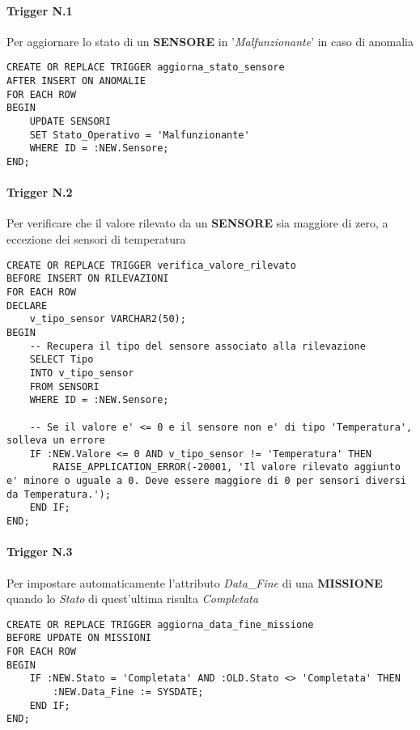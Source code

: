 \paragraph{Trigger N.1} Per aggiornare lo stato di un \textbf{SENSORE} in '\textit{Malfunzionante}' in caso di anomalia
\begin{lstlisting}
CREATE OR REPLACE TRIGGER aggiorna_stato_sensore
AFTER INSERT ON ANOMALIE
FOR EACH ROW
BEGIN
    UPDATE SENSORI
    SET Stato_Operativo = 'Malfunzionante'
    WHERE ID = :NEW.Sensore;
END;
\end{lstlisting}

\paragraph{Trigger N.2} Per verificare che il valore rilevato da un \textbf{SENSORE} sia maggiore di zero, a eccezione dei sensori di temperatura
\begin{lstlisting}
CREATE OR REPLACE TRIGGER verifica_valore_rilevato
BEFORE INSERT ON RILEVAZIONI
FOR EACH ROW
DECLARE
    v_tipo_sensor VARCHAR2(50);
BEGIN
    -- Recupera il tipo del sensore associato alla rilevazione
    SELECT Tipo 
    INTO v_tipo_sensor
    FROM SENSORI
    WHERE ID = :NEW.Sensore;
    
    -- Se il valore e' <= 0 e il sensore non e' di tipo 'Temperatura', solleva un errore
    IF :NEW.Valore <= 0 AND v_tipo_sensor != 'Temperatura' THEN
        RAISE_APPLICATION_ERROR(-20001, 'Il valore rilevato aggiunto e' minore o uguale a 0. Deve essere maggiore di 0 per sensori diversi da Temperatura.');
    END IF;
END;
\end{lstlisting}

\paragraph{Trigger N.3} Per impostare automaticamente l'attributo \textit{Data\_Fine} di una \textbf{MISSIONE} quando lo \textit{Stato} di quest'ultima risulta \textit{Completata}
\begin{lstlisting}
CREATE OR REPLACE TRIGGER aggiorna_data_fine_missione
BEFORE UPDATE ON MISSIONI
FOR EACH ROW
BEGIN
    IF :NEW.Stato = 'Completata' AND :OLD.Stato <> 'Completata' THEN
        :NEW.Data_Fine := SYSDATE;
    END IF;
END;
\end{lstlisting}

